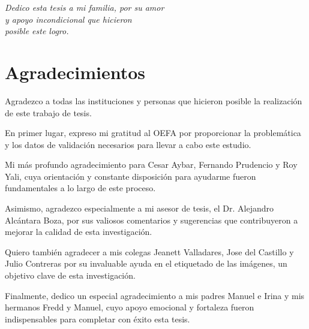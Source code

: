 \newpage
\vspace*{\fill}
\begin{flushright}
    \small{\textit{
    Dedico esta tesis a mi familia, por su amor \\ 
    y apoyo incondicional que hicieron \\
    posible este logro.}}

\end{flushright}
\vspace{1cm}
\thispagestyle{empty}

\newpage
\section*{Agradecimientos}

Agradezco a todas las instituciones y personas 
que hicieron posible la realización de este trabajo de tesis.

En primer lugar, expreso mi gratitud al OEFA por proporcionar 
la problemática y los datos de validación necesarios para llevar 
a cabo este estudio.

Mi más profundo agradecimiento para Cesar Aybar, Fernando Prudencio 
y Roy Yali, cuya orientación y constante disposición para ayudarme fueron 
fundamentales a lo largo de este proceso.

Asimismo, agradezco especialmente a mi asesor de tesis, el Dr. Alejandro 
Alcántara Boza, por sus valiosos comentarios y sugerencias que contribuyeron
a mejorar la calidad de esta investigación.

Quiero también agradecer a mis colegas Jeanett Valladares, Jose del Castillo y 
Julio Contreras por su invaluable ayuda en el etiquetado de las imágenes, un objetivo
clave de esta investigación.

Finalmente, dedico un especial agradecimiento a mis padres Manuel e Irina y mis hermanos 
Fredd y Manuel, cuyo apoyo emocional y fortaleza fueron indispensables para completar con 
éxito esta tesis.
\thispagestyle{empty}

\clearpage
\pagestyle{empty}
\begingroup    
    \renewcommand{\contentsname}{
        \vspace{-\baselineskip}
        \begin{center}
            \thispagestyle{empty}
            \large{ÍNDICE}
        \end{center}
        \vspace{-\baselineskip}
    }
    \tableofcontents
\endgroup
\clearpage

